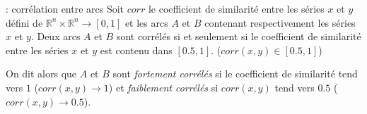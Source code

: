 \begin{definition} :  corr\'elation entre arcs\newline
Soit $corr$ le coefficient de similarit\'e entre les s\'eries $x$ et $y$ d\'efini de $\mathbb{R}^{n} \times \mathbb{R}^{n}
 \rightarrow [0,1]$ et 
 les arcs $A$ et $B$ contenant respectivement les s\'eries $x$ et $y$.
 \newline
Deux arcs $A$ et $B$ sont corr\'el\'es si et seulement si le coefficient de similarit\'e entre les s\'eries $x$ et $y$ est contenu dans $[0.5,1]$. 
($corr(x, y) \in [0.5,1]$)
\end{definition}
On dit alors que  $A$ et $B$ sont {\em fortement  corr\'el\'es} si le coefficient de similarit\'e tend vers $1$ ($corr(x, y) \rightarrow 1$) et {\em faiblement corr\'el\'es} si $corr(x, y)$ tend vers $0.5$ ($corr(x,y) \rightarrow 0.5$).
\newline


